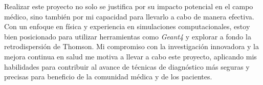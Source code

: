 Realizar este proyecto no solo se justifica por su impacto potencial en el campo médico, sino también por mi capacidad para llevarlo a cabo de manera efectiva. Con un enfoque en física y experiencia en simulaciones computacionales, estoy bien posicionado para utilizar herramientas como \textit{Geant4} y explorar a fondo la retrodispersión de Thomson. Mi compromiso con la investigación innovadora y la mejora continua en salud me motiva a llevar a cabo este proyecto, aplicando mis habilidades para contribuir al avance de técnicas de diagnóstico más seguras y precisas para beneficio de la comunidad médica y de los pacientes.



\vspace*{\fill}